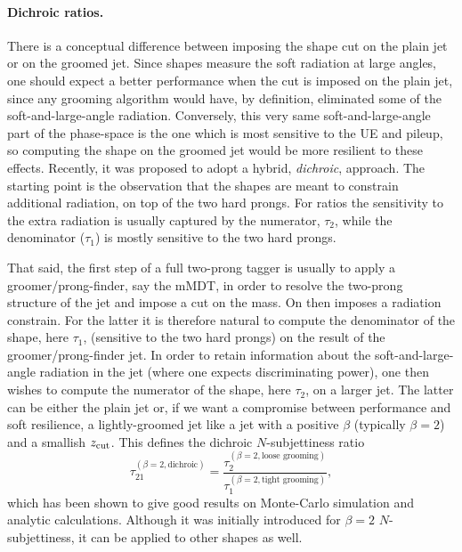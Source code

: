 \paragraph{Dichroic ratios.} There is a conceptual difference between
  imposing the shape cut on the plain jet or on the groomed jet.
  Since shapes measure the soft radiation at large angles, one should
  expect a better performance when the cut is imposed on the plain
  jet, since any grooming algorithm would have, by definition,
  eliminated some of the soft-and-large-angle radiation.
  Conversely, this very same soft-and-large-angle part of the
  phase-space is the one which is most sensitive to the UE and pileup,
  so computing the shape on the groomed jet would be more resilient to
  these effects.
  Recently, it was proposed to adopt a hybrid, \emph{dichroic},
  approach.
  The starting point is the observation that the shapes are meant to
  constrain additional radiation, on top of the two hard prongs. For
  ratios the sensitivity to the extra radiation is usually captured
  by the numerator, \eg $\tau_2$, while the denominator (\eg $\tau_1$)
  is mostly sensitive to the two hard prongs.
  
  That said, the first step of a full two-prong tagger is usually to
  apply a groomer/prong-finder, say the mMDT, in order to resolve the
  two-prong structure of the jet and impose a cut on the mass.  On
  then imposes a radiation constrain.
  For the latter it is therefore natural to compute the denominator of
  the shape, here $\tau_1$, (sensitive to the two hard prongs) on the
  result of the groomer/prong-finder jet.
  In order to retain information about the soft-and-large-angle
  radiation in the jet (where one expects discriminating power), one
  then wishes to compute the numerator of the shape, here $\tau_2$, on
  a larger jet. The latter can be either the plain jet or, if we want
  a compromise between performance and soft resilience, a
  lightly-groomed jet like a \SD jet with a positive $\beta$
  (typically $\beta=2$) and a smallish $z_{\text{cut}}$.
  This defines the dichroic $N$-subjettiness ratio~\cite{Salam:2016yht}
  \begin{equation}\label{eq:def-dichroic}
    \tau_{21}^{(\beta=2,\text{dichroic})}
      = \frac{\tau_2^{(\beta=2,\text{loose grooming})}}{\tau_1^{(\beta=2,\text{tight grooming})}},
  \end{equation}
  which has been shown to give good results on Monte-Carlo simulation
  and analytic calculations.
  Although it was initially introduced for $\beta=2$ $N$-subjettiness,
  it can be applied to other shapes as well.


